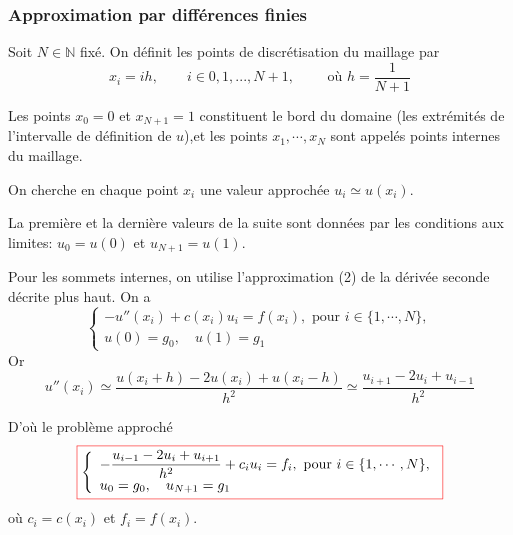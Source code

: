 \documentclass{beamer}
\newcommand{\myredbox}[1]{\fcolorbox{red}{white}{$\displaystyle#1$}}
\begin{document}
 \begin{frame}
\frametitle{Approximation  par différences finies}
 \begin{center}
 \end{center}
Soit $N \in \mathbb{N}$ fixé. On définit les points de discrétisation du maillage par 
\[x_i =ih, \qquad i\in{0,1,...,N+1}, \qquad \mbox{ où } h= \frac{1}{N+1}\]

Les points $x_0 = 0$ et $x_{N+1} = 1$ constituent le bord du domaine (les extrémités de l'intervalle de définition de $u$),et les points $x_1,\cdots ,x_N$ sont appelés points internes du maillage.

On cherche en chaque point $x_i$ une valeur approchée $u_i\simeq u(x_i)$. 

La première et la dernière valeurs de la suite sont données par les conditions aux limites: $u_0 = u(0)$ et $u_{N+1} = u(1)$.
\end{frame}
 
 
 \begin{frame}

 Pour les sommets internes, on utilise l'approximation (2) de la dérivée seconde décrite plus haut. On a
 \begin{equation}
\left\{\begin{array}{l}
-u''(x_i)+c(x_i)u_i = f(x_i), \mbox { pour } i\in\{1, \cdots , N\},\\
u(0)=g_0,\quad u(1)=g_1
\end{array}
\right.
\end{equation}
Or
\[u''(x_i)\simeq \frac{u(x_i+h)-2u(x_i)+u(x_i-h)}{h^2}\simeq \frac{u_{i+1}-2u_i+u_{i-1}}{h^2}\] 


D'où le problème approché
\begin{equation}
\myredbox{\left\{\begin{array}{l}
-{\displaystyle \frac{u_{i-1}-2u_i+u_{i+1}}{h^2}+c_iu_i }= f_i, \mbox { pour } i\in\{1, \cdots , N\},\\
u_0=g_0,\quad u_{N+1}=g_1
\end{array}
\right.}
\end{equation}
où $c_i=c(x_i)$ et $f_i=f(x_i)$.
 \end{frame}
 
\end{document}
